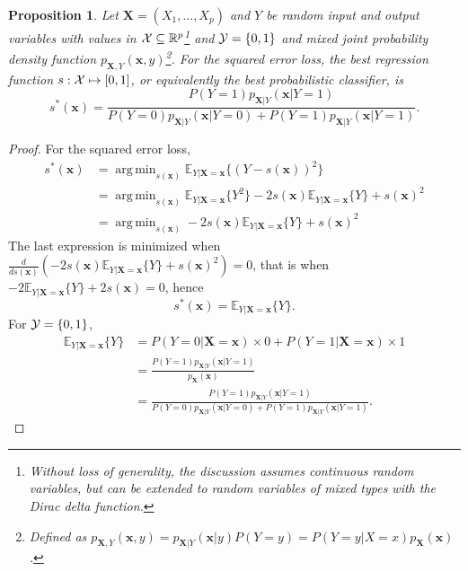 \documentclass[12pt]{article}
\DeclareMathOperator*{\argmin}{arg\,min}
\numberwithin{equation}{section}
\theoremstyle{plain}
\newtheorem{proposition}[theorem]{Proposition}
\begin{document}
\begin{proposition} \label{thm:best-classifier}
Let $\mathbf{X} = (X_1, ..., X_p)$ and $Y$ be random input and output variables
with values in ${\cal X} \subseteq \mathbb{R}^p$\footnote{Without loss of
generality, the discussion assumes continuous random variables, but can be
extended to random variables of mixed types with the Dirac delta function.}
and ${\cal Y} = \{0, 1\}$ and mixed joint probability density  function
$p_{\mathbf{X},Y}(\mathbf{x}, y)$\footnote{Defined as
$p_{\mathbf{X},Y}(\mathbf{x}, y) = p_{\mathbf{X}|Y}(\mathbf{x}|y) P(Y=y) =
P(Y=y|X=x) p_{\mathbf{X}}(\mathbf{x})$.}. For the squared error loss, the best
regression function $s : {\cal X} \mapsto [0, 1]$, or equivalently the best
probabilistic classifier, is
\begin{equation}
s^*(\mathbf{x}) = \frac{P(Y=1) p_{\mathbf{X}|Y}(\mathbf{x}|Y=1)}{P(Y=0) p_{\mathbf{X}|Y}(\mathbf{x} | Y=0) + P(Y=1) p_{\mathbf{X}|Y}(\mathbf{x} | Y=1)}.
\end{equation}
\end{proposition}

\begin{proof}
For the squared error loss,
\begin{align}
s^*(\mathbf{x}) &= \argmin_{s(\mathbf{x})} \mathbb{E}_{Y|\mathbf{X}=\mathbf{x}} \{ (Y - s(\mathbf{x}))^2 \} \nonumber \\
&=  \argmin_{s(\mathbf{x})} \mathbb{E}_{Y|\mathbf{X}=\mathbf{x}} \{ Y^2 \} - 2s(\mathbf{x}) \mathbb{E}_{Y|\mathbf{X}=\mathbf{x}} \{ Y \} + s(\mathbf{x})^2 \nonumber \\
&=  \argmin_{s(\mathbf{x})} -2s(\mathbf{x}) \mathbb{E}_{Y|\mathbf{X}=\mathbf{x}} \{ Y \} + s(\mathbf{x})^2
\end{align}
The last expression is minimized when $\frac{d}{ds(\mathbf{x})} (-2s(\mathbf{x}) \mathbb{E}_{Y|\mathbf{X}=\mathbf{x}} \{ Y \} + s(\mathbf{x})^2) = 0$,
that is when $-2 \mathbb{E}_{Y|\mathbf{X}=\mathbf{x}} \{ Y \} + 2 s(\mathbf{x}) = 0$, hence
\begin{equation}
s^*(\mathbf{x}) = \mathbb{E}_{Y|\mathbf{X}=\mathbf{x}} \{ Y \}.
\end{equation}
For ${\cal Y} = \{ 0, 1 \}$,
\begin{align}
\mathbb{E}_{Y|\mathbf{X}=\mathbf{x}} \{ Y \} &= P(Y=0|\mathbf{X}=\mathbf{x}) \times 0 +  P(Y=1|\mathbf{X}=\mathbf{x}) \times 1 \nonumber \\
&= \frac{P(Y=1) p_{\mathbf{X}|Y}(\mathbf{x}|Y=1)}{p_{\mathbf{X}}(\mathbf{x})} \nonumber \\
&= \frac{P(Y=1) p_{\mathbf{X}|Y}(\mathbf{x}|Y=1)}{P(Y=0) p_{\mathbf{X}|Y}(\mathbf{x} | Y=0) + P(Y=1) p_{\mathbf{X}|Y}(\mathbf{x} | Y=1)}.
\end{align}
\end{proof}
\end{document}
